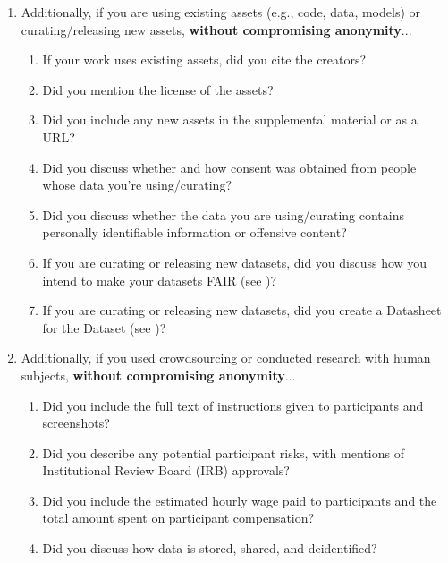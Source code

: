 \begin{enumerate}
\item Additionally, if you are using existing assets (e.g., code, data, models) or curating/releasing new assets, \textbf{without compromising anonymity}...
\begin{enumerate}
  \item If your work uses existing assets, did you cite the creators?
  \item Did you mention the license of the assets?
  \item Did you include any new assets in the supplemental material or as a URL?
  \item Did you discuss whether and how consent was obtained from people whose data you're using/curating?
  \item Did you discuss whether the data you are using/curating contains personally identifiable information or offensive content?
\item If you are curating or releasing new datasets, did you discuss how you intend to make your datasets FAIR (see \citet{fair})?
\item If you are curating or releasing new datasets, did you create a Datasheet for the Dataset (see \citet{gebru2021datasheets})? 
\end{enumerate}

\item Additionally, if you used crowdsourcing or conducted research with human subjects, \textbf{without compromising anonymity}...
\begin{enumerate}
  \item Did you include the full text of instructions given to participants and screenshots?
  \item Did you describe any potential participant risks, with mentions of Institutional Review Board (IRB) approvals?
  \item Did you include the estimated hourly wage paid to participants and the total amount spent on participant compensation?
  \item Did you discuss how data is stored, shared, and deidentified?
\end{enumerate}

\end{enumerate}
